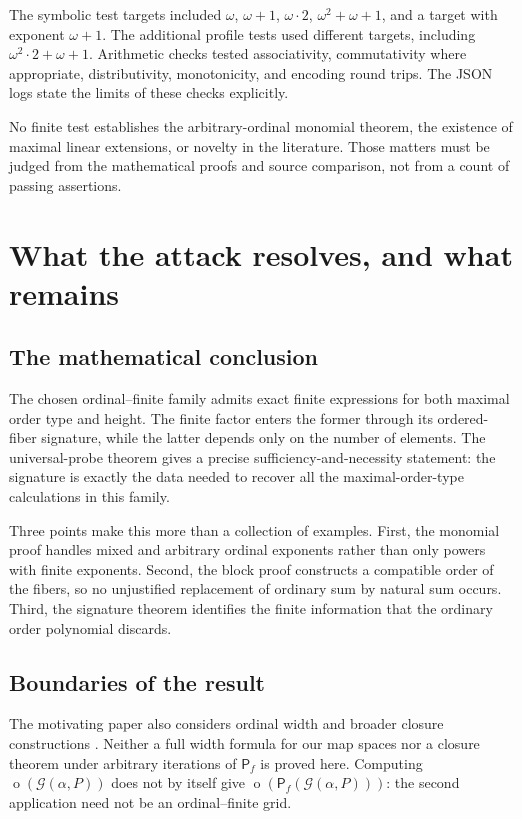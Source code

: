 \documentclass[11pt,a4paper]{article}
\theoremstyle{definition}
\theoremstyle{remark}
\newcommand{\Pf}{\mathsf{P}_{\!f}}
\newcommand{\Grid}{\mathcal{G}}
\newcommand{\otype}{\operatorname{o}}
\begin{document}
The symbolic test targets included $\omega$, $\omega+1$, $\omega\cdot2$,
$\omega^2+\omega+1$, and a target with exponent $\omega+1$. The additional
profile tests used different targets, including
$\omega^2\cdot2+\omega+1$. Arithmetic checks tested associativity,
commutativity where appropriate, distributivity, monotonicity, and encoding
round trips. The JSON logs state the limits of these checks explicitly.

No finite test establishes the arbitrary-ordinal monomial theorem, the
existence of maximal linear extensions, or novelty in the literature.
Those matters must be judged from the mathematical proofs and source
comparison, not from a count of passing assertions.

\section{What the attack resolves, and what remains}

\subsection{The mathematical conclusion}
The chosen ordinal--finite family admits exact finite expressions for
both maximal order type and height. The finite factor enters the former
through its ordered-fiber signature, while the latter depends only on the
number of elements. The universal-probe theorem gives a precise
sufficiency-and-necessity statement: the signature is exactly the data
needed to recover all the maximal-order-type calculations in this family.

Three points make this more than a collection of examples. First, the
monomial proof handles mixed and arbitrary ordinal exponents rather than
only powers with finite exponents. Second, the block proof constructs a
compatible order of the fibers, so no unjustified replacement of ordinary
sum by natural sum occurs. Third, the signature theorem identifies the
finite information that the ordinary order polynomial discards.

\subsection{Boundaries of the result}
The motivating paper also considers ordinal width and broader closure
constructions \cite{AHLLSSV}. Neither a full width formula for our map
spaces nor a closure theorem under arbitrary iterations of $\Pf$ is
proved here. Computing $\otype(\Grid(\alpha,P))$ does not by itself give
$\otype(\Pf(\Grid(\alpha,P)))$: the second application need not be an
ordinal--finite grid.
\end{document}

